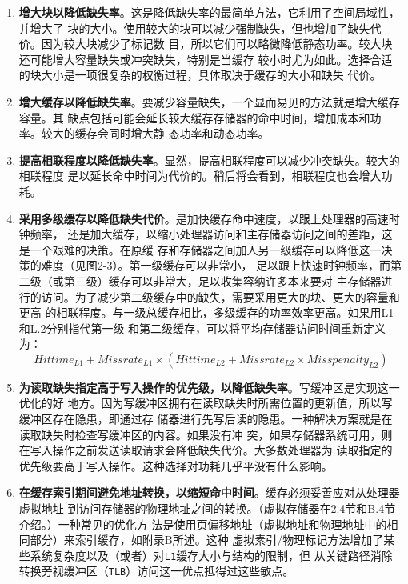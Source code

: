 \begin{enumerate}
    \item \textbf{增大块以降低缺失率}。这是降低缺失率的最简单方法，它利用了空间局域性，并增大了
    块的大小。使用较大的块可以减少强制缺失，但也增加了缺失代价。因为较大块减少了标记数
    目，所以它们可以略微降低静态功率。较大块还可能增大容量缺失或冲突缺失，特别是当缓存
    较小时尤为如此。选择合适的块大小是一项很复杂的权衡过程，具体取决于缓存的大小和缺失
    代价。
    \item \textbf{增大缓存以降低缺失率}。要减少容量缺失，一个显而易见的方法就是增大缓存容量。其
    缺点包括可能会延长较大缓存存储器的命中时间，增加成本和功率。较大的缓存会同时增大静
    态功率和动态功率。
    \item \textbf{提高相联程度以降低缺失率}。显然，提高相联程度可以减少冲突缺失。较大的相联程度
    是以延长命中时间为代价的。稍后将会看到，相联程度也会增大功耗。
    \item \textbf{采用多级缓存以降低缺失代价}。是加快缓存命中速度，以跟上处理器的高速时钟频率，
    还是加大缓存，以缩小处理器访问和主存储器访问之间的差距，这是一个艰难的决策。在原缓
    存和存储器之间加人另一级缓存可以降低这一决策的难度（见图2-3）。第一级缓存可以非常小，
    足以跟上快速时钟频率，而第二级（或第三级）缓存可以非常大，足以收集容纳许多本来要对
    主存储器进行的访问。为了减少第二级缓存中的缺失，需要采用更大的块、更大的容量和更高
    的相联程度。与一级总缓存相比，多级缓存的功率效率更高。如果用L1 和L.2分别指代第一级
    和第二级缓存，可以将平均存储器访问时间重新定义为：
    \begin{equation}
        {Hit time}_{L1} + {Miss rate}_{L1} \times ({Hit time}_{L2} + {Miss rate}_{L2} \times {Miss penalty}_{L2})
    \end{equation}
    \item \textbf{为读取缺失指定高于写入操作的优先级，以降低缺失率}。写缓冲区是实现这一优化的好
    地方。因为写缓冲区拥有在读取缺失时所需位置的更新值，所以写缓冲区存在隐患，即通过存
    储器进行先写后读的隐患。一种解决方案就是在读取缺失时检查写缓冲区的内容。如果没有冲
    突，如果存储器系统可用，则在写入操作之前发送读取请求会降低缺失代价。大多数处理器为
    读取指定的优先级要高于写入操作。这种选择对功耗几乎平没有什么影响。
    \item \textbf{在缓存索引期间避免地址转换，以缩短命中时间}。缓存必须妥善应对从处理器虚拟地址
    到访问存储器的物理地址之间的转换。（虚拟存储器在2.4节和B.4节介绍。）一种常见的优化方
    法是使用页偏移地址（虚拟地址和物理地址中的相同部分）来索引缓存，如附录B所述。这种
    虚拟素引/物理标记方法增加了某些系统复杂度以及（或者）对\verb|L1|缓存大小与结构的限制，但
    从关键路径消除转换旁视缓冲区（\verb|TLB|）访问这一优点抵得过这些敏点。
\end{enumerate}

